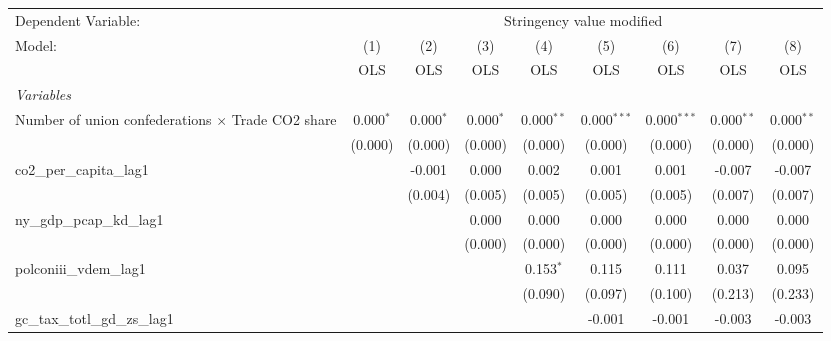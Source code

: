 
\begingroup
\centering
\begin{tabular}{lcccccccc}
   \toprule
   Dependent Variable: & \multicolumn{8}{c}{Stringency value modified}\\
   Model:                                                   & (1)         & (2)         & (3)         & (4)          & (5)           & (6)           & (7)          & (8)\\  
                                                            &  OLS        & OLS         & OLS         & OLS          & OLS           & OLS           & OLS          & OLS\\  
   \midrule
   \emph{Variables}\\
   Number of union confederations $\times$ Trade CO2 share  & 0.000$^{*}$ & 0.000$^{*}$ & 0.000$^{*}$ & 0.000$^{**}$ & 0.000$^{***}$ & 0.000$^{***}$ & 0.000$^{**}$ & 0.000$^{**}$\\   
                                                            & (0.000)     & (0.000)     & (0.000)     & (0.000)      & (0.000)       & (0.000)       & (0.000)      & (0.000)\\   
   co2\_per\_capita\_lag1                                   &             & -0.001      & 0.000       & 0.002        & 0.001         & 0.001         & -0.007       & -0.007\\   
                                                            &             & (0.004)     & (0.005)     & (0.005)      & (0.005)       & (0.005)       & (0.007)      & (0.007)\\   
   ny\_gdp\_pcap\_kd\_lag1                                  &             &             & 0.000       & 0.000        & 0.000         & 0.000         & 0.000        & 0.000\\   
                                                            &             &             & (0.000)     & (0.000)      & (0.000)       & (0.000)       & (0.000)      & (0.000)\\   
   polconiii\_vdem\_lag1                                    &             &             &             & 0.153$^{*}$  & 0.115         & 0.111         & 0.037        & 0.095\\   
                                                            &             &             &             & (0.090)      & (0.097)       & (0.100)       & (0.213)      & (0.233)\\   
   gc\_tax\_totl\_gd\_zs\_lag1                              &             &             &             &              & -0.001        & -0.001        & -0.003       & -0.003\\   

\end{tabular}
